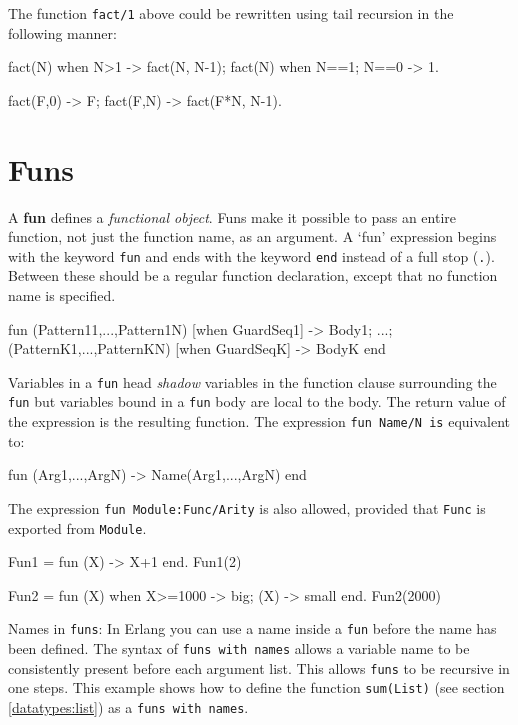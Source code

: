 The function \texttt{fact/1} above could be rewritten using tail
recursion in the following manner:

 \begin{erlang}
fact(N) when N>1 -> fact(N, N-1);
fact(N) when N==1; N==0 -> 1.

fact(F,0) -> F;                 %
fact(F,N) -> fact(F*N, N-1).
\end{erlang}


\section{Funs}
\label{functions:funs}
A \textbf{fun} defines a \textit{functional object}. Funs make it
possible to pass an entire function, not just the function name, as an
argument. A `fun' expression begins with the keyword \texttt{fun} and
ends with the keyword \texttt{end} instead of a full stop
(\texttt{.}).  Between these should be a regular function
declaration, except that no function name is specified.

\begin{erlang}
fun
    (Pattern11,...,Pattern1N) [when GuardSeq1] ->
        Body1;
        ...;
    (PatternK1,...,PatternKN) [when GuardSeqK] ->
        BodyK
end
\end{erlang}

Variables in a \texttt{fun} head \textit{shadow} variables in the function
clause surrounding the \texttt{fun} but variables bound in a \texttt{fun} body are local
to the body.  The return value of the expression is the resulting function. The expression
\texttt{fun Name/N is} equivalent to:

\begin{erlang}
fun (Arg1,...,ArgN) -> Name(Arg1,...,ArgN) end
\end{erlang}

The expression \texttt{fun Module:Func/Arity} is also allowed, provided that \texttt{Func} is exported
from \texttt{Module}.

\begin{erlang}
Fun1 = fun (X) -> X+1 end.
Fun1(2)         %

Fun2 = fun (X) when X>=1000 -> big; (X) -> small end.
Fun2(2000)      %
\end{erlang}

Names in \texttt{funs}: In Erlang you can use a name inside a \texttt{fun} before the name has been
defined. The syntax of \texttt{funs with names} allows a variable name to be
consistently present before each argument list. This allows \texttt{funs} to be
recursive in one steps. This example shows how to define the function
\texttt{sum(List)} (see section \ref{datatypes:list}) as a \texttt{funs with names}.

